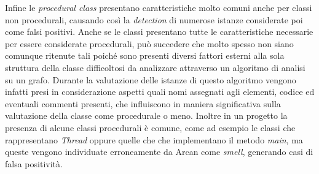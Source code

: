        Infine le \textit{procedural class} presentano caratteristiche molto comuni anche per classi non procedurali, causando così la \textit{detection} di numerose istanze considerate poi come falsi positivi. Anche se le classi presentano tutte le caratteristiche necessarie per essere considerate procedurali, può succedere che molto spesso non siano comunque ritenute tali poiché sono presenti diversi fattori esterni alla sola struttura della classe difficoltosi da analizzare attraverso un algoritmo di analisi su un grafo.
        Durante la valutazione delle istanze di questo algoritmo vengono infatti presi in considerazione aspetti quali nomi assegnati agli elementi, codice ed eventuali commenti presenti, che influiscono in maniera significativa sulla valutazione della classe come procedurale o meno. %
        Inoltre in un progetto la presenza di alcune classi procedurali è comune, come ad esempio le classi che rappresentano \textit{Thread} oppure quelle che che implementano il metodo \textit{main}, ma queste vengono individuate erroneamente da Arcan come \textit{smell}, generando casi di falsa positività.

